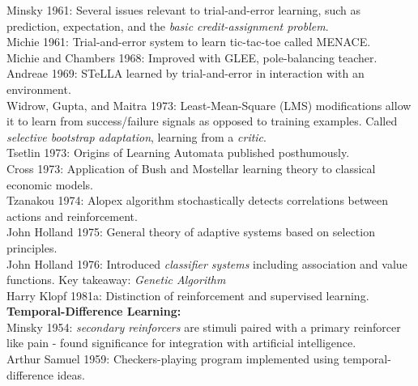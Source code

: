 \documentclass[a4paper]{article}
\begin{document}
Minsky 1961: Several issues relevant to trial-and-error learning, such as prediction, expectation, and the \textit{basic credit-assignment problem}.\\

Michie 1961: Trial-and-error system to learn tic-tac-toe called MENACE.\\

Michie and Chambers 1968: Improved with GLEE, pole-balancing teacher.\\

Andreae 1969: STeLLA learned by trial-and-error in interaction with an environment.\\

Widrow, Gupta, and Maitra 1973: Least-Mean-Square (LMS) modifications allow it to learn from success/failure signals as opposed to training examples. Called \textit{selective bootstrap adaptation}, learning from a \textit{critic}.\\

Tsetlin 1973: Origins of Learning Automata published posthumously.\\

Cross 1973: Application of Bush and Mostellar learning theory to classical economic models.\\

Tzanakou 1974: Alopex algorithm stochastically detects correlations between actions and reinforcement.\\

John Holland 1975: General theory of adaptive systems based on selection principles.\\

John Holland 1976: Introduced \textit{classifier systems} including association and value functions. Key takeaway: \textit{Genetic Algorithm}\\

Harry Klopf 1981a: Distinction of reinforcement and supervised learning.\\

\textbf{Temporal-Difference Learning:}\\

Minsky 1954: \textit{secondary reinforcers} are stimuli paired with a primary reinforcer like pain - found significance for integration with artificial intelligence.\\

Arthur Samuel 1959: Checkers-playing program implemented using temporal-difference ideas.\\
\end{document}
